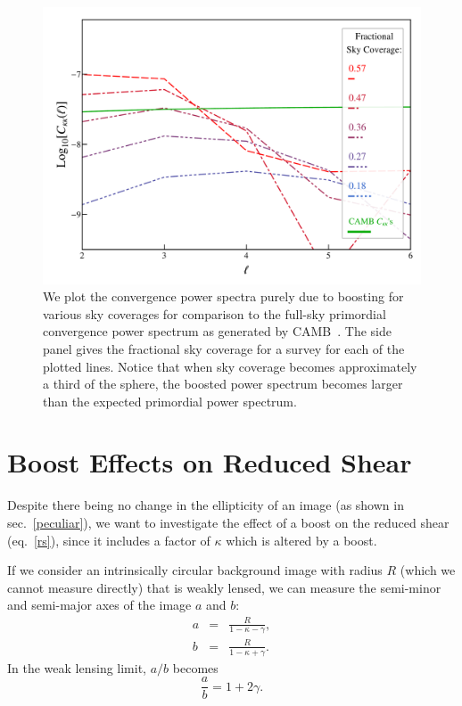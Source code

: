 \documentclass[useAMS,fleqn,usenatbib]{mn2e}
\begin{document}
\begin{figure}
	\includegraphics[scale=.23]{Ckkplot.pdf}
	\caption{We plot the convergence power spectra purely due to boosting for various sky coverages
	for comparison to the full-sky primordial convergence power spectrum as generated by 
	{CAMB\sc}~\citep{Lewis:1999bs}. The side panel gives the fractional sky coverage for a survey
	for each of the plotted lines. Notice that when sky coverage becomes approximately a third of the sphere,
	the boosted power spectrum becomes larger than the expected primordial power
	spectrum. }\label{ps_plot}
\end{figure}

\section{Boost Effects on Reduced Shear}
\label{reduced}
Despite there being no change in the ellipticity of an image (as shown in sec.~\ref{peculiar}),
we want to investigate the effect of a boost on the reduced shear (eq.~\ref{rs}), since it includes a factor
of $\kappa$ which is altered by a boost.

If we consider an intrinsically circular background image with radius $R$ (which
we cannot measure directly) that is weakly lensed, we can measure the semi-minor and semi-major
axes of the image $a$ and $b$:
\begin{eqnarray}
a & = & \frac{R}{1-\kappa-\gamma},\\
b & = & \frac{R}{1-\kappa+\gamma}.
\end{eqnarray}
In the weak lensing limit, $a/b$ becomes
\begin{equation}
\frac{a}{b}=1+2\gamma .
\end{equation}
\end{document}
